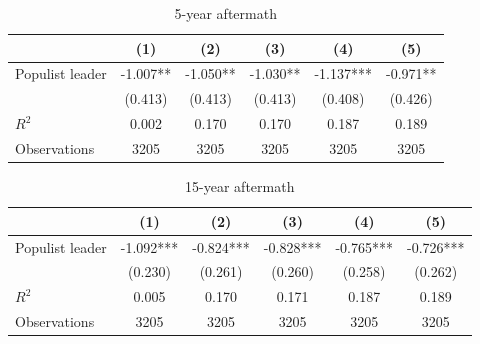 \begin{table}[htbp]\centering
\def\sym#1{\ifmmode^{#1}\else\(^{#1}\)\fi}
\caption{5-year aftermath}
\begin{tabular}{l*{5}{c}}
\hline\hline
                    &\multicolumn{1}{c}{(1)}   &\multicolumn{1}{c}{(2)}   &\multicolumn{1}{c}{(3)}   &\multicolumn{1}{c}{(4)}   &\multicolumn{1}{c}{(5)}   \\
\hline
Populist leader     &      -1.007** &      -1.050** &      -1.030** &      -1.137***&      -0.971** \\
                    &     (0.413)   &     (0.413)   &     (0.413)   &     (0.408)   &     (0.426)   \\
\hline
\(R^{2}\)           &       0.002   &       0.170   &       0.170   &       0.187   &       0.189   \\
Observations        &        3205   &        3205   &        3205   &        3205   &        3205   \\
\hline\hline
\end{tabular}
\end{table}
\begin{table}[htbp]\centering
\def\sym#1{\ifmmode^{#1}\else\(^{#1}\)\fi}
\caption{15-year aftermath}
\begin{tabular}{l*{5}{c}}
\hline\hline
                    &\multicolumn{1}{c}{(1)}   &\multicolumn{1}{c}{(2)}   &\multicolumn{1}{c}{(3)}   &\multicolumn{1}{c}{(4)}   &\multicolumn{1}{c}{(5)}   \\
\hline
Populist leader     &      -1.092***&      -0.824***&      -0.828***&      -0.765***&      -0.726***\\
                    &     (0.230)   &     (0.261)   &     (0.260)   &     (0.258)   &     (0.262)   \\
\hline
\(R^{2}\)           &       0.005   &       0.170   &       0.171   &       0.187   &       0.189   \\
Observations        &        3205   &        3205   &        3205   &        3205   &        3205   \\
\hline\hline
\end{tabular}
\end{table}
